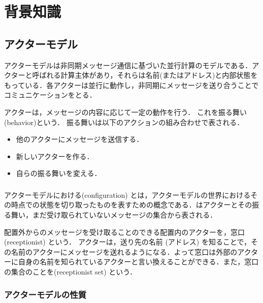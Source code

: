 \section{背景知識}


\subsection{アクターモデル}

アクターモデルは非同期メッセージ通信に基づいた並行計算のモデルである．アクターと呼ばれる計算主体があり，それらは名前(またはアドレス)と内部状態をもっている．各アクターは並行に動作し，非同期にメッセージを送り合うことでコミュニケーションをとる．

アクターは，メッセージの内容に応じて一定の動作を行う．
これを振る舞い(behavior)という．
振る舞いは以下のアクションの組み合わせで表される．

\begin{itemize}
  \item 他のアクターにメッセージを送信する．
  \item 新しいアクターを作る．
  \item 自らの振る舞いを変える．
\end{itemize}

\subsubsection{\conf}

アクターモデルにおける\conf (configuration) とは，アクターモデルの世界におけるその時点での状態を切り取ったものを表すための概念である．\conf はアクターとその振る舞い，まだ受け取られていないメッセージの集合から表される．

配置外からのメッセージを受け取ることのできる配置内のアクターを，窓口 (receptionist) という．
アクターは，送り先の名前 (アドレス) を知ることで，その名前のアクターにメッセージを送れるようになる．よって窓口は外部のアクターに自身の名前を知られているアクターと言い換えることができる．また，窓口の集合のことを\recep (receptionist set) という．


\subsubsection{アクターモデルの性質}

